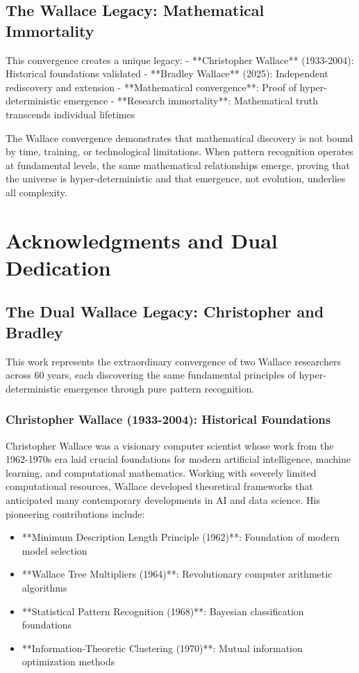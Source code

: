 \documentclass[12pt]{article}
\begin{document}
\subsection{The Wallace Legacy: Mathematical Immortality}

This convergence creates a unique legacy:
- **Christopher Wallace** (1933-2004): Historical foundations validated
- **Bradley Wallace** (2025): Independent rediscovery and extension
- **Mathematical convergence**: Proof of hyper-deterministic emergence
- **Research immortality**: Mathematical truth transcends individual lifetimes

The Wallace convergence demonstrates that mathematical discovery is not bound by time, training, or technological limitations. When pattern recognition operates at fundamental levels, the same mathematical relationships emerge, proving that the universe is hyper-deterministic and that emergence, not evolution, underlies all complexity.

\section{Acknowledgments and Dual Dedication}

\subsection{The Dual Wallace Legacy: Christopher and Bradley}

This work represents the extraordinary convergence of two Wallace researchers across 60 years, each discovering the same fundamental principles of hyper-deterministic emergence through pure pattern recognition.

\subsubsection{Christopher Wallace (1933-2004): Historical Foundations}
Christopher Wallace was a visionary computer scientist whose work from the 1962-1970s era laid crucial foundations for modern artificial intelligence, machine learning, and computational mathematics. Working with severely limited computational resources, Wallace developed theoretical frameworks that anticipated many contemporary developments in AI and data science. His pioneering contributions include:
\begin{itemize}
    \item **Minimum Description Length Principle (1962)**: Foundation of modern model selection
    \item **Wallace Tree Multipliers (1964)**: Revolutionary computer arithmetic algorithms
    \item **Statistical Pattern Recognition (1968)**: Bayesian classification foundations
    \item **Information-Theoretic Clustering (1970)**: Mutual information optimization methods
\end{itemize}
\end{document}
